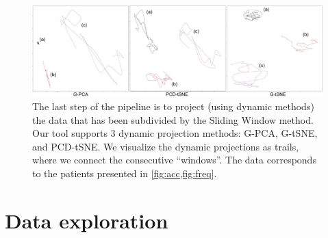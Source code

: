 \begin{figure}[ht]
\centering
\includegraphics[width=\linewidth]{figures/nemo/nemo1-projections.pdf}
\caption{The last step of the pipeline is to project (using dynamic methods) the data that has been subdivided by the Sliding Window method. Our tool supports 3 dynamic projection methods: G-PCA, G-tSNE, and PCD-tSNE. We visualize the dynamic projections as trails, where we connect the consecutive ``windows''. The data corresponds to the patients presented in \cref{fig:acc,fig:freq}.}
\label{fig:nemo1-projections}
\end{figure}

\section{Data exploration}


